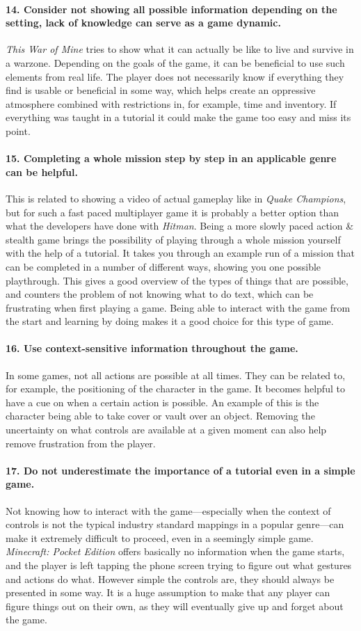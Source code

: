 \paragraph{14. Consider not showing all possible information depending on the setting, lack of knowledge can serve as a game dynamic.}
\textit{This War of Mine} tries to show what it can actually be like to live and survive in a warzone. Depending on the goals of the game, it can be beneficial to use such elements from real life. The player does not necessarily know if everything they find is usable or beneficial in some way, which helps create an oppressive atmosphere combined with restrictions in, for example, time and inventory. If everything was taught in a tutorial it could make the game too easy and miss its point.
\paragraph{15. Completing a whole mission step by step in an applicable genre can be helpful.}
This is related to showing a video of actual gameplay like in \textit{Quake Champions}, but for such a fast paced multiplayer game it is probably a better option than what the developers have done with \textit{Hitman}. Being a more slowly paced action \& stealth game brings the possibility of playing through a whole mission yourself with the help of a tutorial. It takes you through an example run of a mission that can be completed in a number of different ways, showing you one possible playthrough. This gives a good overview of the types of things that are possible, and counters the problem of not knowing what to do text, which can be frustrating when first playing a game. Being able to interact with the game from the start and learning by doing makes it a good choice for this type of game.
\paragraph{16. Use context-sensitive information throughout the game.}
In some games, not all actions are possible at all times. They can be related to, for example, the positioning of the character in the game. It becomes helpful to have a cue on when a certain action is possible. An example of this is the character being able to take cover or vault over an object. Removing the uncertainty on what controls are available at a given moment can also help remove frustration from the player.
\paragraph{17. Do not underestimate the importance of a tutorial even in a simple game.}
Not knowing how to interact with the game---especially when the context of controls is not the typical industry standard mappings in a popular genre---can make it extremely difficult to proceed, even in a seemingly simple game. \textit{Minecraft: Pocket Edition} offers basically no information when the game starts, and the player is left tapping the phone screen trying to figure out what gestures and actions do what. However simple the controls are, they should always be presented in some way. It is a huge assumption to make that any player can figure things out on their own, as they will eventually give up and forget about the game.

